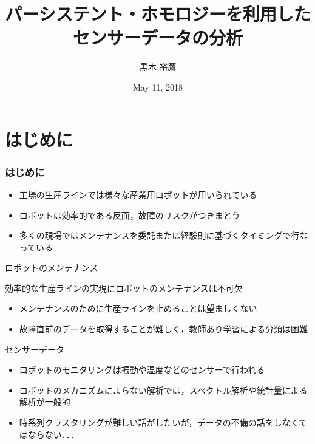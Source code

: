 \documentclass[dvipdfmx,cjk]{beamer}
\theoremstyle{example}
\begin{document}
\title[Beamer]{パーシステント・ホモロジーを利用した\\センサーデータの分析} 
\author[TUS]{黒木 裕鷹}            %
\date{May 11, 2018}

\begin{frame}                  %
\titlepage                     %
\end{frame}

\begin{frame}                  %
\tableofcontents
\end{frame}

\section{はじめに}             %
\begin{frame}
\frametitle{はじめに}              %

\begin{itemize}
\setlength{\itemsep}{8mm}
\item 工場の生産ラインでは様々な産業用ロボットが用いられている
\item ロボットは効率的である反面，故障のリスクがつきまとう
\item 多くの現場ではメンテナンスを委託または経験則に基づくタイミングで行なっている
\end{itemize}
\end{frame}

\begin{frame}{ロボットのメンテナンス}
\centerline{効率的な生産ラインの実現にロボットのメンテナンスは不可欠}
\vspace{8mm}
\begin{itemize}
\setlength{\itemsep}{6mm}
\item メンテナンスのために生産ラインを止めることは望ましくない
\item 故障直前のデータを取得することが難しく，教師あり学習による分類は困難
\end{itemize}
\end{frame}

\begin{frame}{センサーデータ}
\begin{itemize}
\setlength{\itemsep}{8mm}
\item ロボットのモニタリングは振動や温度などのセンサーで行われる
\item ロボットのメカニズムによらない解析では，スペクトル解析や統計量による解析が一般的
\item 時系列クラスタリングが難しい話がしたいが，データの不備の話をしなくてはならない．．．
\end{itemize}
\end{frame}
\end{document}
